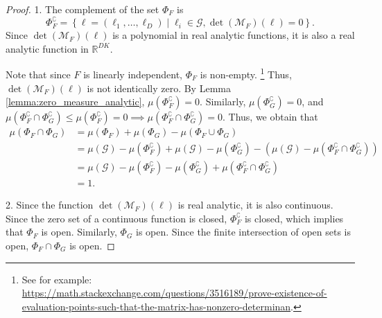 \begin{proof}

1. The complement of the set $\Phi_{F}$ is \begin{equation*}
        \Phi_F^\complement = \left\{ \mathbf{\boldsymbol \ell} = (\ell_1, \ldots, \ell_D) \mid {\ell}_i \in \mathcal{G}, \det\left(\mathcal{M}_F\right)(\boldsymbol{\ell})=0 \right\}.
    \end{equation*}
    Since $\det\left(\mathcal{M}_F\right)(\boldsymbol {\ell})$ is a polynomial in real analytic functions, it is also a real analytic function in $\mathbb{R}^{DK}$. 

    Note that since $F$ is linearly independent, $\Phi_F$ is non-empty. \footnote{See for example: \\ \url{https://math.stackexchange.com/questions/3516189/prove-existence-of-evaluation-points-such-that-the-matrix-has-nonzero-determinan}.} Thus, $\det\left(\mathcal{M}_F\right)(\boldsymbol{\ell})$ is not identically zero. By Lemma \ref{lemma:zero_measure_analytic}, $\mu \left(\Phi_F^\complement\right) = 0$. Similarly, $\mu \left(\Phi_G^\complement\right) = 0$, and $\displaystyle \mu \left( \Phi_F^\complement \cap \Phi_G^\complement \right) \leq \mu \left( \Phi_F^\complement\right) = 0 \implies \mu \left( \Phi_F^\complement \cap \Phi_G^\complement \right) = 0$.
Thus, we obtain that
    \begin{align*}
        \mu \left( \Phi_F \cap \Phi_G\right) &= \mu \left( \Phi_F\right) + \mu \left( \Phi_G\right) - \mu\left( \Phi_F \cup \Phi_G \right)\\
        &= \mu(\mathcal{G})-\mu \left( \Phi_F^\complement\right) + \mu(\mathcal{G}) - \mu \left( \Phi_G^\complement\right) - \left(\mu(\mathcal{G}) - \mu\left( \Phi_F^\complement \cap \Phi_G^\complement \right) \right)\\
        &= \mu(\mathcal{G}) - \mu \left( \Phi_F^\complement\right) - \mu \left( \Phi_G^\complement\right) + \mu\left( \Phi_F^\complement \cap \Phi_G^\complement \right) \\
        &= 1.
    \end{align*}

2. 
Since the function $\det\left(\mathcal{M}_F\right)(\mathbf{\boldsymbol \ell})$ is real analytic, it is also continuous. Since the zero set of a continuous function is closed, $\Phi_F^\complement$ is closed, which implies that $\Phi_F$ is open. Similarly, $\Phi_G$ is open. Since the finite intersection of open sets is open, $\Phi_F \cap \Phi_G$ is open.
\end{proof}

